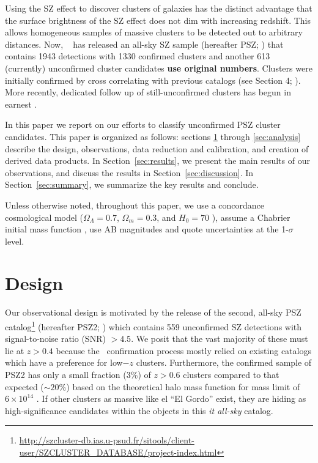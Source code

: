 \documentclass[apj, revtex4-1]{emulateapj}
\begin{document}
Using the SZ effect to discover clusters of galaxies has the distinct advantage that the surface brightness of the SZ effect does not dim with increasing redshift. This allows homogeneous samples of massive clusters to be detected out to arbitrary distances. Now, \planck\ \citep{Tauber2010, PlanckCollaboration2011} has released an all-sky SZ sample (hereafter PSZ; \citealt{PlanckCollaboration2014, PlanckCollaboration2015a}) that contains 1943 detections with 1330 confirmed clusters and another 613 (currently) unconfirmed cluster candidates {\bf use original numbers}. Clusters were initially confirmed by cross correlating with previous catalogs (see Section 4; \citealt{PlanckCollaboration2014}). More recently, dedicated follow up of still-unconfirmed clusters has begun in earnest .

In this paper we report on our efforts to classify unconfirmed PSZ cluster candidates. This paper is organized as follows: sections \ref{sec:design} through \ref{sec:analysis} describe the design, observations, data reduction and calibration, and creation of derived data products. In Section~\ref{sec:results}, we present the main results of our observations, and discuss the results in Section~\ref{sec:discussion}. In Section~\ref{sec:summary}, we summarize the key results and conclude.

Unless otherwise noted, throughout this paper, we use a concordance cosmological model ($\Omega_\Lambda = 0.7$, $\Omega_m = 0.3$, and $H_0= 70$ \kms \permpc), assume a Chabrier initial mass function \citep{Chabrier2003}, use AB magnitudes \citep{Oke1974} and quote uncertainties at the 1-$\sigma$ level.

\section{Design}\label{sec:design}
Our observational design is motivated by the release of the second, all-sky PSZ catalog\footnote{\url{http://szcluster-db.ias.u-psud.fr/sitools/client-user/SZCLUSTER_DATABASE/project-index.html}} (hereafter PSZ2; \citealt{PlanckCollaboration2015a}) which contains 559 unconfirmed SZ detections with signal-to-noise ratio (SNR) $> 4.5$. We posit that the vast majority of these must lie at $z>0.4$ because the \planck\ confirmation process \citep{PlanckCollaboration2014} mostly relied on existing catalogs which have a preference for low$-z$ clusters. Furthermore, the confirmed sample of PSZ2 has only a small fraction (3\%) of $z > 0.6$ clusters compared to that expected ($\sim20$\%) based on the theoretical halo mass function  for mass limit of $6\times10^{14}$ \msol. If other clusters as massive like el ``El Gordo'' exist, they are hiding as high-significance candidates within the objects in this \textit{it all-sky} catalog.
\end{document}
